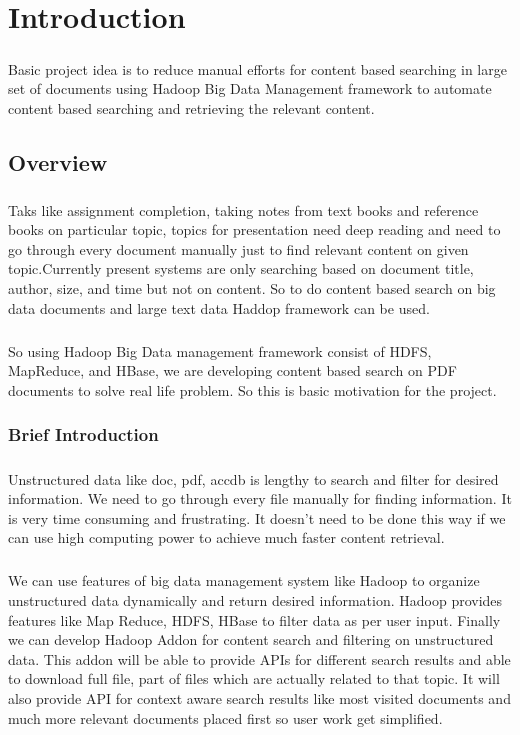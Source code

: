 \chapter{ Introduction}
\paragraph{} Basic project idea is to reduce manual efforts for content based searching in large set of documents using Hadoop Big Data Management framework to automate content based searching and retrieving the relevant content.

\section{Overview}
\paragraph{} Taks like assignment completion, taking notes from text books and reference books on particular topic, topics for presentation need deep reading and need to go through every document manually just to find relevant content on given topic.Currently present systems are only searching based on document title, author, size, and time but not on content. So to do content based search on big data documents and large text data Haddop framework can be used.
\paragraph{} So using Hadoop Big Data management framework consist of HDFS, MapReduce, and HBase, we are developing content based search on PDF documents to solve real life problem. So this is basic motivation for the project.

\subsection{Brief Introduction}
\paragraph{}
Unstructured data like doc, pdf, accdb is lengthy to search and filter for desired information. We need to go through every file manually for finding information. It is very time consuming and frustrating. It doesn’t need to be done this way if we can use high computing power to achieve much faster content retrieval.
\paragraph{} We can use features of big data management system like Hadoop to organize unstructured data dynamically and return desired information. Hadoop provides features like Map Reduce, HDFS, HBase to filter data as per user input. Finally we can develop Hadoop Addon for content search and filtering on unstructured data. This addon will be able to provide APIs for different search results and able to download full file, part of files which are actually related to that topic. It will also provide API for context aware search results like most visited documents and much more relevant documents placed first so user work get simplified.
